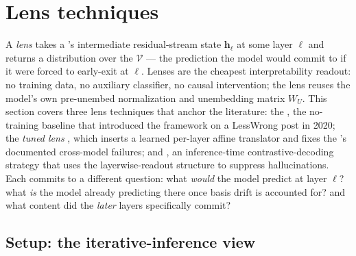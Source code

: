 
\section{Lens techniques}
\label{sec:logit-lens-family}
\label{sec:lens-frontier}

A \emph{lens} takes a 's intermediate residual-stream state
$\mathbf{h}_\ell$ at some layer $\ell$ and returns a distribution over
the  $\mathcal{V}$ — the prediction the model would commit to
if it were forced to early-exit at $\ell$. Lenses are the cheapest
interpretability readout: no training data, no auxiliary classifier, no
causal intervention; the lens reuses the model's own pre-unembed
normalization and unembedding matrix $W_U$. This section covers three
lens techniques that anchor the literature: the \emph{}
\citep{nostalgebraist2020-logit-lens}, the no-training baseline that
introduced the framework on a LessWrong post in 2020; the \emph{tuned
lens} \citep{belrose2023-tuned-lens}, which inserts a learned per-layer
affine translator and fixes the 's documented cross-model
failures; and \emph{} \citep{chuang2023-dola}, an inference-time
contrastive-decoding strategy that uses the layerwise-readout structure
to suppress hallucinations. Each commits to a different question: what
\emph{would} the model predict at layer $\ell$? what \emph{is} the model
already predicting there once basis drift is accounted for? and what
content did the \emph{later} layers specifically commit?

\subsection{Setup: the iterative-inference view}
\label{sec:lens-setup}

